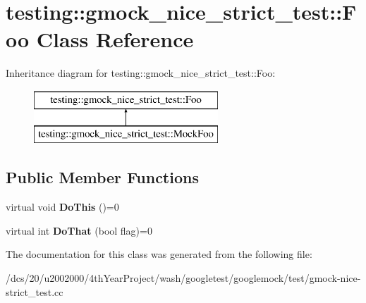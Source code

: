 \hypertarget{classtesting_1_1gmock__nice__strict__test_1_1Foo}{}\section{testing\+:\+:gmock\+\_\+nice\+\_\+strict\+\_\+test\+:\+:Foo Class Reference}
\label{classtesting_1_1gmock__nice__strict__test_1_1Foo}
Inheritance diagram for testing\+:\+:gmock\+\_\+nice\+\_\+strict\+\_\+test\+:\+:Foo\+:\begin{figure}[H]
\begin{center}
\leavevmode
\includegraphics[height=2.000000cm]{classtesting_1_1gmock__nice__strict__test_1_1Foo}
\end{center}
\end{figure}
\subsection*{Public Member Functions}
\begin{DoxyCompactItemize}
\item 
\mbox{\label{classtesting_1_1gmock__nice__strict__test_1_1Foo_a79a3cdbd8d9d9f6bc87580563b0d7cec}} 
virtual void {\bfseries Do\+This} ()=0
\item 
\mbox{\label{classtesting_1_1gmock__nice__strict__test_1_1Foo_a8527a459b03f333a809a3376311a9f8b}} 
virtual int {\bfseries Do\+That} (bool flag)=0
\end{DoxyCompactItemize}


The documentation for this class was generated from the following file\+:\begin{DoxyCompactItemize}
\item 
/dcs/20/u2002000/4th\+Year\+Project/wash/googletest/googlemock/test/gmock-\/nice-\/strict\+\_\+test.\+cc\end{DoxyCompactItemize}
